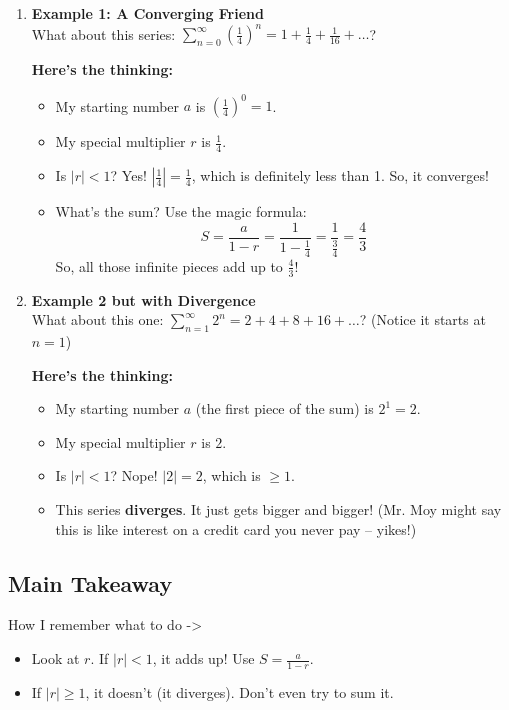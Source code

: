 \documentclass{article}
\begin{document}
\begin{enumerate}[label=\textbf{\arabic*.},itemsep=15pt] %

  \item \textbf{Example 1: A Converging Friend} \\
        What about this series: \(\displaystyle\sum_{n=0}^{\infty}\left(\frac{1}{4}\right)^n = 1 + \frac{1}{4} + \frac{1}{16} + \dots\)?

        \textbf{Here's the thinking:}
        \begin{itemize}
            \item My starting number \(a\) is \((\frac{1}{4})^0 = 1\).
            \item My special multiplier \(r\) is \(\frac{1}{4}\).
            \item Is \(|r| < 1\)? Yes! \(|\frac{1}{4}| = \frac{1}{4}\), which is definitely less than 1. So, it converges!
            \item What's the sum? Use the magic formula:
                  \[ S = \frac{a}{1-r} = \frac{1}{1-\frac{1}{4}} = \frac{1}{\frac{3}{4}} = \frac{4}{3} \]
            So, all those infinite pieces add up to \(\frac{4}{3}\)!
        \end{itemize}
        
        \vspace{10pt}

  \item \textbf{Example 2 but with Divergence} \\
        What about this one: \(\displaystyle\sum_{n=1}^{\infty} 2^n = 2 + 4 + 8 + 16 + \dots\)? (Notice it starts at $n=1$)

        \textbf{Here's the thinking:}
        \begin{itemize}
            \item My starting number \(a\) (the first piece of the sum) is \(2^1 = 2\).
            \item My special multiplier \(r\) is \(2\).
            \item Is \(|r| < 1\)? Nope! \(|2| = 2\), which is \(\ge 1\).
            \item This series \textbf{diverges}. It just gets bigger and bigger! (Mr. Moy might say this is like interest on a credit card you never pay – yikes!)
        \end{itemize}
\end{enumerate}


\subsection*{Main Takeaway}
How I remember what to do -> 
\begin{itemize}
    \item Look at \(r\). If \(|r|<1\), it adds up! Use \(S = \frac{a}{1-r}\).
    \item If \(|r| \ge 1\), it doesn't (it diverges). Don't even try to sum it.
\end{itemize}
\end{document}
